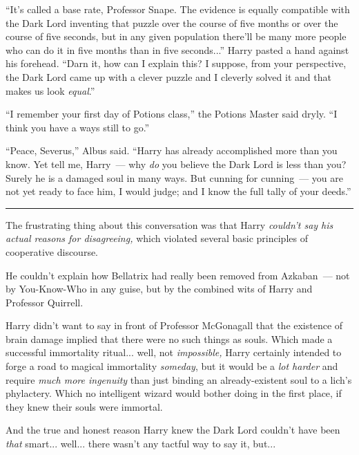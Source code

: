 ``It's called a base rate, Professor Snape. The evidence is equally compatible with the Dark Lord inventing that puzzle over the course of five months or over the course of five seconds, but in any given population there'll be many more people who can do it in five months than in five seconds...'' Harry pasted a hand against his forehead. ``Darn it, how can I explain this? I suppose, from your perspective, the Dark Lord came up with a clever puzzle and I cleverly solved it and that makes us look \emph{equal}.''

``I remember your first day of Potions class,'' the Potions Master said dryly. ``I think you have a ways still to go.''

``Peace, Severus,'' Albus said. ``Harry has already accomplished more than you know. Yet tell me, Harry~--- why \emph{do} you believe the Dark Lord is less than you? Surely he is a damaged soul in many ways. But cunning for cunning~--- you are not yet ready to face him, I would judge; and I know the full tally of your deeds.''

\begin{center}\rule{3in}{0.4pt}\end{center}

The frustrating thing about this conversation was that Harry \emph{couldn't say his actual reasons for disagreeing,} which violated several basic principles of cooperative discourse.

He couldn't explain how Bellatrix had really been removed from Azkaban~--- not by You-Know-Who in any guise, but by the combined wits of Harry and Professor Quirrell.

Harry didn't want to say in front of Professor McGonagall that the existence of brain damage implied that there were no such things as souls. Which made a successful immortality ritual... well, not \emph{impossible,} Harry certainly intended to forge a road to magical immortality \emph{someday}, but it would be a \emph{lot harder} and require \emph{much more ingenuity} than just binding an already-existent soul to a lich's phylactery. Which no intelligent wizard would bother doing in the first place, if they knew their souls were immortal.

And the true and honest reason Harry knew the Dark Lord couldn't have been \emph{that} smart... well... there wasn't any tactful way to say it, but...

